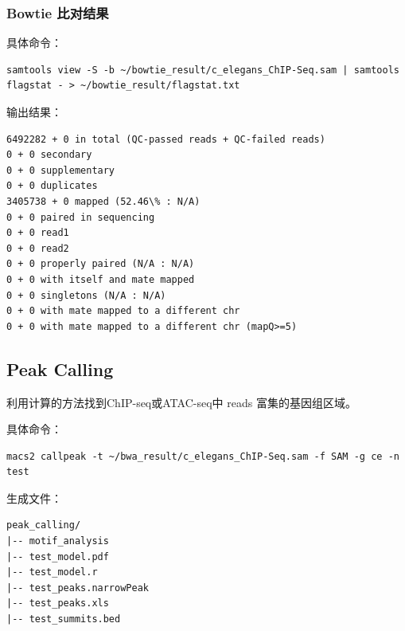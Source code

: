 \documentclass[UTF8]{ctexart}
\begin{document}
\subsubsection{Bowtie 比对结果}

具体命令：

\begin{lstlisting}
samtools view -S -b ~/bowtie_result/c_elegans_ChIP-Seq.sam | samtools flagstat - > ~/bowtie_result/flagstat.txt
\end{lstlisting}

输出结果：

\begin{lstlisting}
6492282 + 0 in total (QC-passed reads + QC-failed reads)
0 + 0 secondary
0 + 0 supplementary
0 + 0 duplicates
3405738 + 0 mapped (52.46\% : N/A)
0 + 0 paired in sequencing
0 + 0 read1
0 + 0 read2
0 + 0 properly paired (N/A : N/A)
0 + 0 with itself and mate mapped
0 + 0 singletons (N/A : N/A)
0 + 0 with mate mapped to a different chr
0 + 0 with mate mapped to a different chr (mapQ>=5)
\end{lstlisting}

\subsection{Peak Calling}

利用计算的方法找到ChIP-seq或ATAC-seq中 reads 富集的基因组区域。

具体命令：

\begin{lstlisting}
macs2 callpeak -t ~/bwa_result/c_elegans_ChIP-Seq.sam -f SAM -g ce -n test
\end{lstlisting}

生成文件：

\begin{lstlisting}
peak_calling/
|-- motif_analysis
|-- test_model.pdf
|-- test_model.r
|-- test_peaks.narrowPeak
|-- test_peaks.xls
|-- test_summits.bed
\end{lstlisting}
\end{document}
